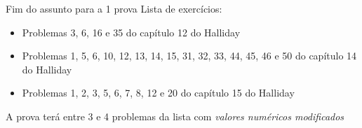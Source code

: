 \documentclass[t,%
brazilian,%
11pt,%
aspectratio=169,%
table%
]{beamer}
\newcommand{\esima}{\textordfeminine }
\begin{document}
\begin{frame}{Fim do assunto para a 1\esima{} prova}
    Lista de exercícios:
    \begin{itemize}
        \item Problemas 3, 6, 16 e 35 do capítulo 12 do Halliday
        \item Problemas 1, 5, 6, 10, 12, 13, 14, 15, 31, 32, 33, 44, 45, 46 e 50 do capítulo 14 do Halliday
        \item Problemas 1, 2, 3, 5, 6, 7, 8, 12 e 20 do capítulo 15 do Halliday
    \end{itemize}

    A prova terá entre 3 e 4 problemas da lista com \textit{valores numéricos modificados}

\end{frame}



\end{document}
